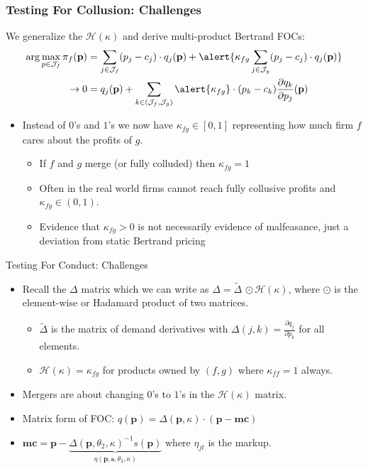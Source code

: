 \documentclass[xcolor=pdftex,dvipsnames,table,mathserif,aspectratio=169]{beamer}
\begin{document}
\begin{frame}
\frametitle{Testing For Collusion: Challenges}
\small
We generalize the $\mathcal{H}(\kappa)$ and derive multi-product Bertrand FOCs:
\begin{align*}
\arg \max_{p \in \mathcal{J}_f} \pi_f (\mathbf{p}) &= \sum_{j \in \mathcal{J}_f} (p_j - c_j) \cdot q_j(\mathbf{p}) +  \alert{\kappa_{fg} \sum_{j \in \mathcal{J}_g} (p_j - c_j) \cdot q_j(\mathbf{p})} \\
\rightarrow 0&= q_j(\mathbf{p}) + \sum_{k \in (\mathcal{J}_f,\mathcal{J}_g)} \alert{\kappa_{fg}}\cdot (p_k - c_k) \frac{\partial q_{k}}{\partial p_j}(\mathbf{p}) 
\end{align*}
\begin{itemize}
\item Instead of $0$'s and $1$'s we now have $\kappa_{fg} \in [0,1]$ representing how much firm $f$ cares about the profits of $g$.
\begin{itemize}
\item If $f$ and $g$ merge (or fully colluded) then $\kappa_{fg} =1$
\item Often in the real world firms cannot reach fully collusive profits and $\kappa_{fg} \in (0,1)$.
\item Evidence that $\kappa_{fg} > 0$ is not necessarily evidence of malfeasance, just a deviation from \alert{static Bertrand pricing}
\end{itemize}
\end{itemize}
\end{frame}


\begin{frame}{Testing For Conduct: Challenges}
\begin{itemize}
\item Recall the $\Delta$ matrix which we can write as $\Delta=\tilde{\Delta}\, \odot \mathcal{H}(\kappa)$, where $\odot$ is the element-wise or Hadamard product of two matrices. 
\begin{itemize}
\item $\tilde{\Delta}$ is the matrix of demand derivatives with $\Delta{(j,k)} = \frac{\partial q_j}{\partial p_k}$ for all elements.
\item $\mathcal{H}(\kappa)=\kappa_{fg}$ for products owned by $(f,g)$ where $\kappa_{ff}=1$ always.
\end{itemize}
\item Mergers are about changing $0$'s to $1$'s in the $\mathcal{H}(\kappa)$ matrix.
\item Matrix form of FOC: $q(\mathbf{p}) = \Delta(\mathbf{p},\kappa)\cdot(\mathbf{p}-\mathbf{mc})$
\item $\mathbf{mc} =  \mathbf{p} - \underbrace{\Delta(\mathbf{p}, \theta_2, \kappa)^{-1} s(\mathbf{p})}_{\eta(\mathbf{p},\mathbf{s},\theta_2,\kappa)}$
where $\eta_{jt}$ is the markup.
\end{itemize}
\end{frame}
\end{document}
